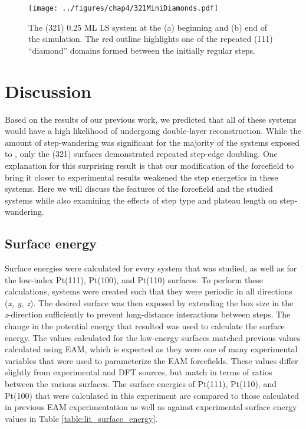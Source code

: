 \begin{figure}
\centering
\texttt{[image: ../figures/chap4/321MiniDiamonds.pdf]}
\caption{The (321) 0.25 ML LS system at the (a) beginning and (b) end of the
simulation. The red outline highlights one of the repeated (111) ``diamond''
domains formed between the initially regular steps.}
\label{fig:diamonds}
\end{figure}

\section{Discussion}
Based on the results of our previous work\citep{Michalka:2013aa}, we predicted
that all of these systems would have a high likelihood of undergoing
double-layer reconstruction. While the amount of step-wandering was significant
for the majority of the systems exposed to , only the (321) surfaces
demonstrated repeated step-edge doubling. One explanation for this surprising
result is that our modification of the  forcefield to bring it
closer to experimental results weakened the  step energetics
in these systems. Here we will discuss the features of the forcefield and the
studied systems while also examining the effects of step type and plateau
length on step-wandering.

\subsection{Surface energy}
Surface energies were calculated for every system that was studied, as well as
for the low-index Pt(111), Pt(100), and Pt(110) surfaces.  To perform these
calculations, systems were created such that they were periodic in all
directions ({\em x, y, z}). The desired surface was then exposed by extending
the box size in the {\em z}-direction sufficiently to prevent long-distance
interactions between steps.  The change in the potential energy that resulted
was used to calculate the surface energy.  The values calculated for the
low-energy surfaces matched previous values calculated using EAM, which is
expected as they were one of many experimental variables that were used to
parameterize the EAM forcefields.\citep{Foiles:1986ky} These values differ
slightly from experimental\citep{Tyson:1977xe, De-Boer:1988tg, Galeev:1980pt} and
DFT\citep{Vitos:1998qq} sources, but match in terms of ratios between the
various surfaces.  The surface energies of Pt(111), Pt(110), and Pt(100) that
were calculated in this experiment are compared to those calculated in previous
EAM experimentation \citep{Foiles:1986ky} as well as against experimental
surface energy values in Table \ref{table:lit_surface_energy}.

